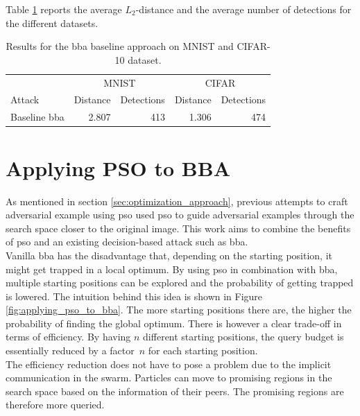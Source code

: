 Table \ref{tbl:baseline} reports the average $L_2$-distance and the average number of detections for the different datasets. 

\begin{table}
	\centering
	\caption[Baseline results]{Results for the \gls{bba} baseline approach on MNIST and CIFAR-10 dataset.}
	\label{tbl:baseline}
	\begin{tabular}{lrrrr}\toprule
			& \multicolumn{2}{c}{MNIST} &\multicolumn{2}{c}{CIFAR} \\ \cmidrule(r){2-3} \cmidrule(r){4-5}
	Attack				&Distance	&Detections	&Distance	&Detections \\ \midrule
	Baseline \gls{bba}	&2.807		&413		&1.306			&474 \\ \bottomrule
	
	\end{tabular}
\end{table}

\section{Applying PSO to BBA} \label{sec:combining_pso_bba}
As mentioned in section \ref{sec:optimization_approach}, previous attempts to craft adversarial example using \gls{pso} used \gls{pso} to guide adversarial examples through the search space closer to the original image. This work aims to combine the benefits of \gls{pso} and an existing decision-based attack such as \gls{bba}.\\

Vanilla \gls{bba} has the disadvantage that, depending on the starting position, it might get trapped in a local optimum. By using \gls{pso} in combination with \gls{bba}, multiple starting positions can be explored and the probability of getting trapped is lowered. The intuition behind this idea is shown in Figure \ref{fig:applying_pso_to_bba}. The more starting positions there are, the higher the probability of finding the global optimum. There is however a clear trade-off in terms of efficiency. By having $n$ different starting positions, the query budget is essentially reduced by a factor~$n$ for each starting position.\\

The efficiency reduction does not have to pose a problem due to the implicit communication in the swarm. Particles can move to promising regions in the search space based on the information of their peers. The promising regions are therefore more queried.\\ 

